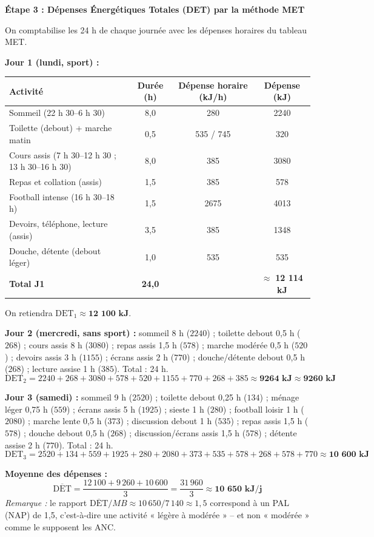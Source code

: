 \documentclass[11pt]{article}
\newcommand{\cle}[1]{{\popxbold\color{popdark}#1}}
\begin{document}
\begin{exoresolu}
\textbf{Étape 3 : Dépenses Énergétiques Totales (DET) par la méthode MET}
\par
On comptabilise les 24 h de chaque journée avec les dépenses horaires du tableau MET.
\par
\textbf{Jour 1 (lundi, sport) :}
\begin{center}
\begin{tabular}{|l|c|c|c|}\hline
\rowcolor{poppinkL}
\textbf{Activité} & \textbf{Durée (h)} & \textbf{Dépense horaire (kJ/h)} & \textbf{Dépense (kJ)} \\ \hline
Sommeil (22 h 30--6 h 30) & 8,0 & 280 & 2240 \\ \hline
Toilette (debout) + marche matin & 0,5 & 535 / 745 & 320 \\ \hline
Cours assis (7 h 30--12 h 30 ; 13 h 30--16 h 30) & 8,0 & 385 & 3080 \\ \hline
Repas et collation (assis) & 1,5 & 385 & 578 \\ \hline
Football intense (16 h 30--18 h) & 1,5 & 2675 & 4013 \\ \hline
Devoirs, téléphone, lecture (assis) & 3,5 & 385 & 1348 \\ \hline
Douche, détente (debout léger) & 1,0 & 535 & 535 \\ \hline
\textbf{Total J1} & \textbf{24,0} & & $\approx$ \textbf{12 114 kJ} \\ \hline
\end{tabular}
\end{center}
On retiendra $\text{DET}_1 \approx \textbf{12 100 kJ}$.
\par
\textbf{Jour 2 (mercredi, sans sport) :} sommeil 8 h ($2240$) ; toilette debout 0,5 h ($268$) ; cours assis 8 h ($3080$) ; repas assis 1,5 h ($578$) ; marche modérée 0,5 h ($520$) ; devoirs assis 3 h ($1155$) ; écrans assis 2 h ($770$) ; douche/détente debout 0,5 h ($268$) ; lecture assise 1 h ($385$). Total : 24 h.
\[
\text{DET}_2 = 2240 + 268 + 3080 + 578 + 520 + 1155 + 770 + 268 + 385 \approx \textbf{9264 kJ} \approx \textbf{9260 kJ}
\]
\par
\textbf{Jour 3 (samedi) :} sommeil 9 h ($2520$) ; toilette debout 0,25 h ($134$) ; ménage léger 0,75 h ($559$) ; écrans assis 5 h ($1925$) ; sieste 1 h ($280$) ; football loisir 1 h ($2080$) ; marche lente 0,5 h ($373$) ; discussion debout 1 h ($535$) ; repas assis 1,5 h ($578$) ; douche debout 0,5 h ($268$) ; discussion/écrans assis 1,5 h ($578$) ; détente assise 2 h ($770$). Total : 24 h.
\[
\text{DET}_3 = 2520 + 134 + 559 + 1925 + 280 + 2080 + 373 + 535 + 578 + 268 + 578 + 770 \approx \textbf{10 600 kJ}
\]
\par
\textbf{Moyenne des dépenses :}
\[
\overline{\text{DET}} = \frac{12\,100 + 9\,260 + 10\,600}{3} = \frac{31\,960}{3} \approx \textbf{10 650 kJ/j}
\]
\textit{Remarque :} le rapport $\overline{\text{DET}} / MB \approx 10\,650 / 7\,140 \approx 1,5$ correspond à un \cle{PAL} (NAP) de 1,5, c'est-à-dire une activité « légère à modérée » -- et non « modérée » comme le supposent les ANC.


\end{exoresolu}
\end{document}
